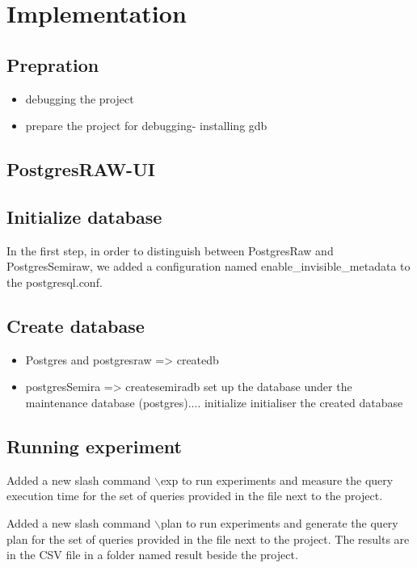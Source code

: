 
\chapter{Implementation}
\label{chapter:implementation}
\section{Prepration}

\begin{itemize}
    \item debugging the project
    \item prepare the project for debugging- installing gdb
\end{itemize}

\section{PostgresRAW-UI}

\section{Initialize database}
In the first step, in order to distinguish between PostgresRaw and PostgresSemiraw, we added a configuration named enable\_invisible\_metadata to the postgresql.conf.
\section{Create database}
\begin{revise}
\begin{itemize}
    \item Postgres and postgresraw => createdb
    \item postgresSemira => createsemiradb
    set up the database under the maintenance database (postgres).... initialize initialiser the created database
\end{itemize}
\end{revise}

\section{Running experiment}
Added a new slash command $\backslash$exp to run experiments and measure the query execution time for the set of queries provided in the file next to the project.

Added a new slash command $\backslash$plan to run experiments and generate the query plan for the set of queries provided in the file next to the project. The results are in the CSV file in a folder named result beside the project.



